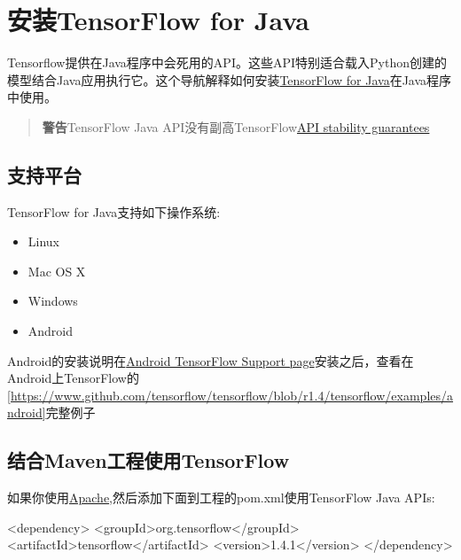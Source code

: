 \section{安装TensorFlow for Java}
Tensorflow提供在Java程序中会死用的API。这些API特别适合载入Python创建的模型结合Java应用执行它。这个导航解释如何安装\href{https://www.tensorflow.org/api_docs/java/reference/org/tensorflow/package-summary}{TensorFlow for Java}在Java程序中使用。
\begin{quote}
\textbf{警告}TensorFlow Java API没有副高TensorFlow\href{https://www.tensorflow.org/programmers_guide/version_semantics}{API stability guarantees}
\end{quote}
\subsection{支持平台}
TensorFlow for Java支持如下操作系统:
\begin{itemize}
\item Linux
\item Mac OS X
\item Windows
\item Android
\end{itemize}
Android的安装说明在\href{https://www.github.com/tensorflow/tensorflow/blob/r1.4/tensorflow/contrib/android}{Android TensorFlow Support page}安装之后，查看在Android上TensorFlow的\ref{https://www.github.com/tensorflow/tensorflow/blob/r1.4/tensorflow/examples/android}{完整例子}
\subsection{结合Maven工程使用TensorFlow}
如果你使用\href{https://maven.apache.org/}{Apache},然后添加下面到工程的pom.xml使用TensorFlow Java APIs:
\begin{xmlcode}
<dependency>
  <groupId>org.tensorflow</groupId>
  <artifactId>tensorflow</artifactId>
  <version>1.4.1</version>
</dependency>
\end{xmlcode}
